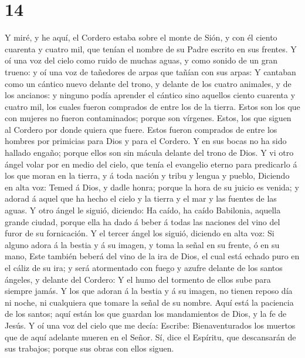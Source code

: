 \hypertarget{section-13}{%
\section{14}\label{section-13}}

 Y miré, y he aquí, el Cordero estaba sobre el monte de
Sión, y con él ciento cuarenta y cuatro mil, que tenían el nombre de su
Padre escrito en sus frentes.  Y oí una voz del cielo como
ruido de muchas aguas, y como sonido de un gran trueno: y oí una voz de
tañedores de arpas que tañían con sus arpas:  Y cantaban
como un cántico nuevo delante del trono, y delante de los cuatro
animales, y de los ancianos: y ninguno podía aprender el cántico sino
aquellos ciento cuarenta y cuatro mil, los cuales fueron comprados de
entre los de la tierra.  Estos son los que con mujeres no
fueron contaminados; porque son vírgenes. Estos, los que siguen al
Cordero por donde quiera que fuere. Estos fueron comprados de entre los
hombres por primicias para Dios y para el Cordero.  Y en
sus bocas no ha sido hallado engaño; porque ellos son sin mácula delante
del trono de Dios.  Y vi otro ángel volar por en medio del
cielo, que tenía el evangelio eterno para predicarlo á los que moran en
la tierra, y á toda nación y tribu y lengua y pueblo, 
Diciendo en alta voz: Temed á Dios, y dadle honra; porque la hora de su
juicio es venida; y adorad á aquel que ha hecho el cielo y la tierra y
el mar y las fuentes de las aguas.  Y otro ángel le
siguió, diciendo: Ha caído, ha caído Babilonia, aquella grande ciudad,
porque ella ha dado á beber á todas las naciones del vino del furor de
su fornicación.  Y el tercer ángel los siguió, diciendo en
alta voz: Si alguno adora á la bestia y á su imagen, y toma la señal en
su frente, ó en su mano,  Este también beberá del vino de
la ira de Dios, el cual está echado puro en el cáliz de su ira; y será
atormentado con fuego y azufre delante de los santos ángeles, y delante
del Cordero:  Y el humo del tormento de ellos sube para
siempre jamás. Y los que adoran á la bestia y á su imagen, no tienen
reposo día ni noche, ni cualquiera que tomare la señal de su nombre.
 Aquí está la paciencia de los santos; aquí están los que
guardan los mandamientos de Dios, y la fe de Jesús.  Y oí
una voz del cielo que me decía: Escribe: Bienaventurados los muertos que
de aquí adelante mueren en el Señor. Sí, dice el Espíritu, que
descansarán de sus trabajos; porque sus obras con ellos siguen.
